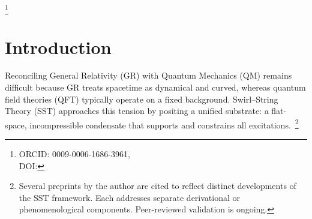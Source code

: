\documentclass[10pt,reprint,aps,onecolumn,nofootinbib]{revtex4-2}
\begin{document}
    \title{\papertitle}
    \author{Omar Iskandarani}
    \thanks{ORCID: 0009-0006-1686-3961, \\ DOI: \paperdoi}
    \date{\today}

    \begin{abstract}
        We present \emph{Swirl--String Theory} (SST), a fluid–topological framework in which matter and radiation are modeled as quantized vortex loops (“swirl strings”) in an incompressible, non-dissipative condensate. Within SST, classical gravitational phenomenology \emph{emerges} as a collective pressure effect in flat space, while local swirl flows \emph{recover} relativistic time-dilation kinematics. We formulate a covariant effective field theory on a preferred foliation, show how topological quantization organizes a discrete particle spectrum, and outline a route by which gauge structures may be \emph{derived} from orientational textures of the medium. A modified Faraday law is proposed in which time-varying swirl areal density sources an electromotive impulse; this yields geometry-independent, quantized flux signatures that serve as explicit falsification targets. Wave–particle duality is described via R/T phase dynamics (unknotted vs.\ knotted states), with measurement modeled as an R$\leftrightarrow$T transition. We compare SST with Kelvin’s vortex lineage, analogue-gravity programs, and emergent-gauge constructions, emphasizing where SST \emph{recovers} established limits (Newtonian gravity, Maxwell electrodynamics, quantum interference) and where it \emph{predicts} deviations that are testable in BECs, superconducting films, and attosecond spectroscopy. All equations use SI units with dimensional checks. Our aim is a parameter-light, topological account that complements standard formulations and invites direct experimental appraisal.
        \emph{Keywords:} vortex dynamics; topological fluid; emergent gauge theory; time dilation; quantum measurement; attosecond spectroscopy
    \end{abstract}
    \maketitle

    \section{Introduction}\label{sec:intro}
        Reconciling General Relativity (GR) with Quantum Mechanics (QM) remains difficult because GR treats spacetime as dynamical and curved, whereas quantum field theories (QFT) typically operate on a fixed background. Swirl–String Theory (SST) approaches this tension by positing a unified substrate: a flat-space, incompressible condensate that supports and constrains all excitations.~\footnote{Several preprints by the author are cited to reflect distinct developments of the SST framework. Each addresses separate derivational or phenomenological components. Peer-reviewed validation is ongoing.}
\end{document}
